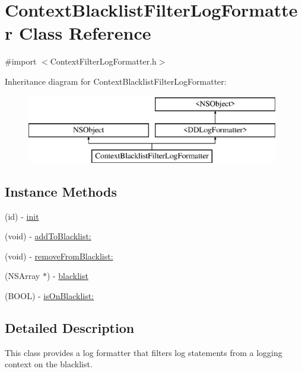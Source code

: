 \hypertarget{interface_context_blacklist_filter_log_formatter}{\section{Context\-Blacklist\-Filter\-Log\-Formatter Class Reference}
\label{interface_context_blacklist_filter_log_formatter}
}


{\ttfamily \#import $<$Context\-Filter\-Log\-Formatter.\-h$>$}

Inheritance diagram for Context\-Blacklist\-Filter\-Log\-Formatter\-:\begin{figure}[H]
\begin{center}
\leavevmode
\includegraphics[height=3.000000cm]{interface_context_blacklist_filter_log_formatter}
\end{center}
\end{figure}
\subsection*{Instance Methods}
\begin{DoxyCompactItemize}
\item 
(id) -\/ \hyperlink{interface_context_blacklist_filter_log_formatter_a053e7e075cce879287271658010ebdf1}{init}
\item 
(void) -\/ \hyperlink{interface_context_blacklist_filter_log_formatter_ae0ff52a0636edf1c84d4298640e17a85}{add\-To\-Blacklist\-:}
\item 
(void) -\/ \hyperlink{interface_context_blacklist_filter_log_formatter_aed14ca55dfdaebefa4a46f0c1ce8607d}{remove\-From\-Blacklist\-:}
\item 
(N\-S\-Array $\ast$) -\/ \hyperlink{interface_context_blacklist_filter_log_formatter_afeba12ac11f8b3a1323c5ee3569855cf}{blacklist}
\item 
(B\-O\-O\-L) -\/ \hyperlink{interface_context_blacklist_filter_log_formatter_ac813526d45b6dfab0f0ce597be6c4fdb}{is\-On\-Blacklist\-:}
\end{DoxyCompactItemize}


\subsection{Detailed Description}
This class provides a log formatter that filters log statements from a logging context on the blacklist. 

